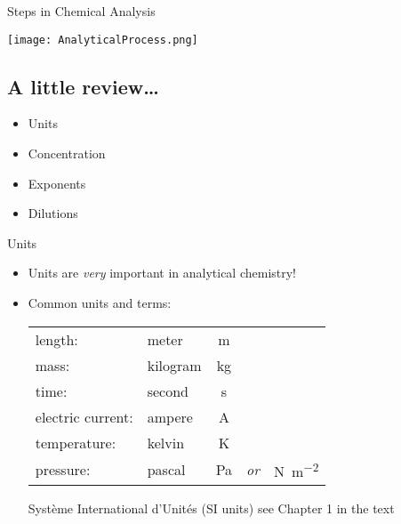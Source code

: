 \documentclass[notes=only]{beamer}
\begin{document}
\begin{frame}{Steps in Chemical Analysis}
	\begin{center}
		\texttt{[image: AnalyticalProcess.png]}
	\end{center}
\end{frame}

\begin{frame}
	\section{A little review\ldots}
	\begin{center}
	\parbox{0.5\linewidth}{
	\begin{itemize}
		\item Units
		\item Concentration
		\item Exponents
		\item Dilutions
	\end{itemize}
}
\end{center}
\end{frame}

\begin{frame}{Units}
	\begin{itemize}
		\item Units are \emph{very} important in analytical chemistry!

		\item Common units and terms:
	\begin{center}
	\begin{tabular} {l l c c c}
		length: & meter & \si{\meter} \\
		mass: & kilogram & \si{\kilo\gram} \\
		time: & second & \si{\second} \\
		electric current: & ampere & \si{\ampere} \\
		temperature: & kelvin & \si{\kelvin} \\
		pressure: & pascal & \si{\pascal} & \emph{or} &
			\si{\newton\per\meter\squared} \\
	\end{tabular}
	\end{center}

	\begin{block}{Syst\`{e}me International d'Unit\'{e}s (SI units)}
		see Chapter 1 in the text
	\end{block}
	\end{itemize}
\end{frame}
\end{document}
